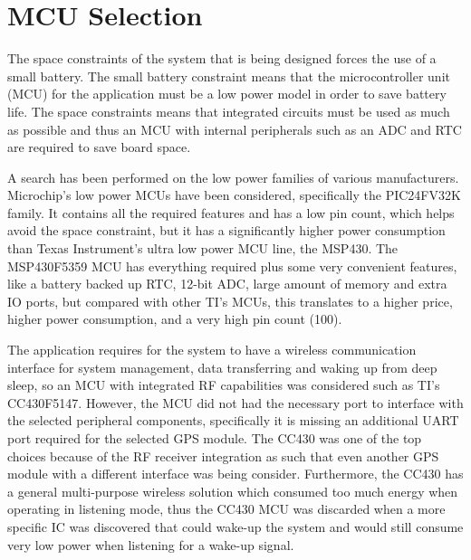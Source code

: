 \section{MCU Selection}
The space constraints of the system that is being designed forces the use of a small battery. The small battery constraint means that the microcontroller unit (MCU) for the application must be a low power model in order to save battery life. The space constraints means that integrated circuits must be used as much as possible and thus an MCU with internal peripherals such as an ADC and RTC are required to save board space. 

A search has been performed on the low power families of various manufacturers. Microchip’s low power MCUs have been considered, specifically the PIC24FV32K family. It contains all the required features and has a low pin count, which helps avoid the space constraint, but it has a significantly higher power consumption than Texas Instrument’s ultra low power MCU line, the MSP430. The MSP430F5359 MCU has everything required plus some very convenient features, like a battery backed up RTC, 12-bit ADC, large amount of memory and extra IO ports, but compared with other TI's MCUs, this translates to a higher price, higher power consumption, and a very high pin count (100). 

The application requires for the system to have a wireless communication interface for system management, data transferring and waking up from deep sleep, so an MCU with integrated RF capabilities was considered such as TI’s CC430F5147. However, the MCU did not had the necessary port to interface with the selected peripheral components, specifically it is missing an additional UART port required for the selected GPS module. The CC430 was one of the top choices because of the RF receiver integration as such that even another GPS module with a different interface was being consider. Furthermore, the CC430 has a general multi-purpose wireless solution which consumed too much energy when operating in listening mode, thus the CC430 MCU was discarded when a more specific IC was discovered that could wake-up the system and would still consume very low power when listening for a wake-up signal. 

